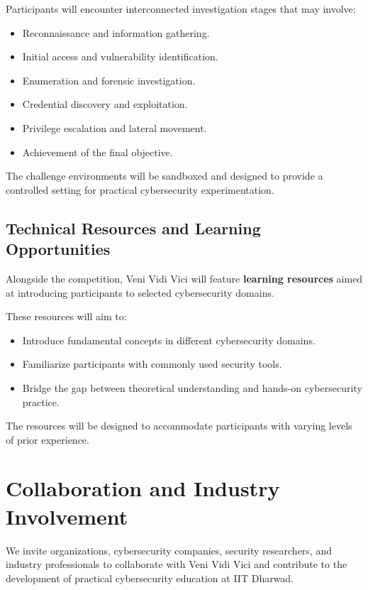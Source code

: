 \documentclass[11pt,a4paper]{article}
\begin{document}
Participants will encounter interconnected investigation stages that may involve:
\begin{itemize}
    \item Reconnaissance and information gathering.
    \item Initial access and vulnerability identification.
    \item Enumeration and forensic investigation.
    \item Credential discovery and exploitation.
    \item Privilege escalation and lateral movement.
    \item Achievement of the final objective.
\end{itemize}

The challenge environments will be sandboxed and designed to provide a controlled
setting for practical cybersecurity experimentation.

\subsection*{Technical Resources and Learning Opportunities}

Alongside the competition, Veni Vidi Vici will feature \textbf{learning resources} aimed at
introducing participants to selected cybersecurity domains.

These resources will aim to:
\begin{itemize}
    \item Introduce fundamental concepts in different cybersecurity domains.
    \item Familiarize participants with commonly used security tools.
    \item Bridge the gap between theoretical understanding and hands-on cybersecurity
    practice.
\end{itemize}

The resources will be designed to accommodate participants with varying levels of
prior experience.

\section{Collaboration and Industry Involvement}

We invite organizations, cybersecurity companies, security researchers, and industry
professionals to collaborate with Veni Vidi Vici and contribute to the development
of practical cybersecurity education at IIT Dharwad.
\end{document}
